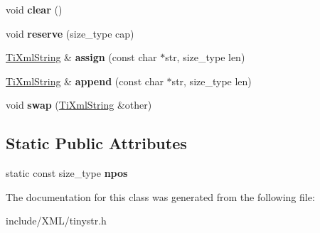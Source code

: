 \begin{DoxyCompactItemize}
\item 
\hypertarget{class_ti_xml_string_ab20e06e4c666abf3bdbfb3a1191d4888}{
void {\bfseries clear} ()}
\label{class_ti_xml_string_ab20e06e4c666abf3bdbfb3a1191d4888}

\item 
\hypertarget{class_ti_xml_string_a88ecf9f0f00cb5c67b6b637958d7049c}{
void {\bfseries reserve} (size\_\-type cap)}
\label{class_ti_xml_string_a88ecf9f0f00cb5c67b6b637958d7049c}

\item 
\hypertarget{class_ti_xml_string_afe4cd3452ccd7cd8c8cac16e24ea28d7}{
\hyperlink{class_ti_xml_string}{TiXmlString} \& {\bfseries assign} (const char $\ast$str, size\_\-type len)}
\label{class_ti_xml_string_afe4cd3452ccd7cd8c8cac16e24ea28d7}

\item 
\hypertarget{class_ti_xml_string_a717b00190c8acdee94816d2f4f20e75a}{
\hyperlink{class_ti_xml_string}{TiXmlString} \& {\bfseries append} (const char $\ast$str, size\_\-type len)}
\label{class_ti_xml_string_a717b00190c8acdee94816d2f4f20e75a}

\item 
\hypertarget{class_ti_xml_string_aa392cbc180752a79f007f4f9280c7762}{
void {\bfseries swap} (\hyperlink{class_ti_xml_string}{TiXmlString} \&other)}
\label{class_ti_xml_string_aa392cbc180752a79f007f4f9280c7762}

\end{DoxyCompactItemize}
\subsection*{Static Public Attributes}
\begin{DoxyCompactItemize}
\item 
\hypertarget{class_ti_xml_string_a1aa6260982d3a63f0c822fe40fd7b37f}{
static const size\_\-type {\bfseries npos}}
\label{class_ti_xml_string_a1aa6260982d3a63f0c822fe40fd7b37f}

\end{DoxyCompactItemize}


The documentation for this class was generated from the following file:\begin{DoxyCompactItemize}
\item 
include/XML/tinystr.h\end{DoxyCompactItemize}
